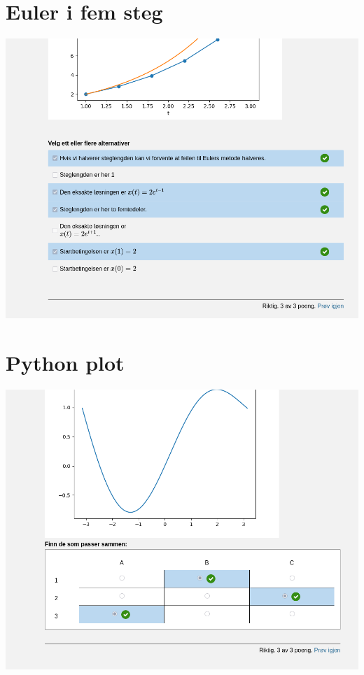 \documentclass[12pt]{article}
\begin{document}
\section*{Euler i fem steg}
\includegraphics[width=\textwidth]{Screenshot_20250521_134642.png}
\newpage
\section*{Python plot}
\includegraphics[width=\textwidth]{Screenshot_20250521_134814.png}
\newpage
\end{document}
